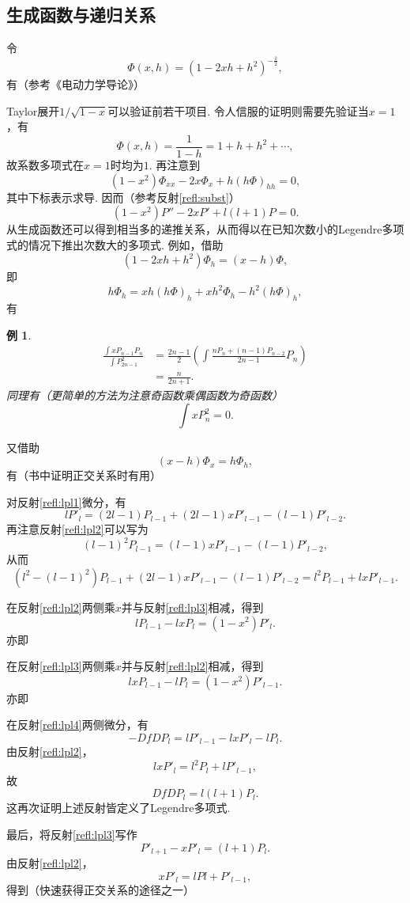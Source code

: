 \documentclass[UTF-8]{ctexart}
\newcommand{\pare}[1]{\left(#1\right)}
\newcommand{\half}{\frac{1}{2}}
\newtheorem{reflection}{反射}
\newcommand{\refl}[1]{\vspace{0.5em}\par\noindent\fbox{%
    \parbox{\textwidth}{%
    \begin{reflection}
        #1
    \end{reflection}
    }%
}\vspace{0.5em}\par}
\newcommand{\rref}[1]{反射\ref{refl:#1}}
\newtheorem{ex}{例}
\begin{document}
  \subsection{生成函数与递归关系}
  令
  \[ \Phi\pare{x,h} = \pare{1-2xh+h^2}^{-\half}, \]
  有（参考《电动力学导论》）
  \refl{
    \[\pare{1-2xh+h^2}^{-\half} = \sum P_l\pare{x}h^l.\]
  }
  Taylor展开$1/\sqrt{1-x}$可以验证前若干项目. 令人信服的证明则需要先验证当$x=1$，有
  \[ \Phi\pare{x,h} = \frac{1}{1-h} = 1+h+h^2+\cdots, \]
  故系数多项式在$x=1$时均为$1$. 再注意到
  \[ \pare{1-x^2}\Phi_{xx}-2x\Phi_x+h\pare{h\Phi}_{hh} = 0, \]
  其中下标表示求导. 因而（参考\rref{subst}）
  \[ \pare{1-x^2}P'' -2xP' + l\pare{l+1}P = 0. \]
  从生成函数还可以得到相当多的递推关系，从而得以在已知次数小的Legendre多项式的情况下推出次数大的多项式. 例如，借助
  \[ \pare{1-2xh+h^2}\Phi_h = \pare{x-h}\Phi, \]
  即
  \[ h\Phi_h = xh\pare{h\Phi}_h + xh^2\Phi_h-h^2\pare{h\Phi}_h, \]
  有
  \refl{
    \label{refl:lpl1}
    \[ lP_l = \pare{2l-1}xP_{l-1} - \pare{l-1}P_{l-2}. \]
  }
  \begin{ex}
    \label{ex:xpp}
    \begin{align*}
      \frac{\int xP_{n-1}P_n}{\int P_{2n-1}^2} &= \frac{2n-1}{2}\pare{\int\frac{nP_n+\pare{n-1}P_{n-2}}{2n-1}P_n} \\
      &= \frac{n}{2n+1}.
    \end{align*}
    同理有（更简单的方法为注意奇函数乘偶函数为奇函数）
    \[ \int xP_n^2 = 0. \]
  \end{ex}
  又借助
  \[ \pare{x-h}\Phi_x = h\Phi_h, \]
  有（书中证明正交关系时有用）
  \refl{
    \label{refl:lpl2}
    \[ lP_l = xP'_l - P'_{l-1}. \]
  }
  对\rref{lpl1}微分，有
  \[ lP'_l = \pare{2l-1}P_{l-1} + \pare{2l-1}xP'_{l-1}-\pare{l-1}P'_{l-2}. \]
  再注意\rref{lpl2}可以写为
  \[ \pare{l-1}^2P_{l-1} = \pare{l-1}xP'_{l-1}-\pare{l-1}P'_{l-2}, \]
  从而
  \[ \pare{l^2-\pare{l-1}^2}P_{l-1} + \pare{2l-1}xP'_{l-1}-\pare{l-1}P'_{l-2} = l^2P_{l-1}+lxP'_{l-1}. \]
  \refl{
    \label{refl:lpl3}
    \[ lP_{l-1} = P'_l - xP'_{l-1}. \]
  }
  在\rref{lpl2}两侧乘$x$并与\rref{lpl3}相减，得到
  \[ lP_{l-1} - lxP_l = \pare{1-x^2}P'_l. \]
  亦即
  \refl{
    \label{refl:lpl4}
    \[ \pare{1-x^2}P'_l = lP_{l-1}-lxP_l. \]
  }
  在\rref{lpl3}两侧乘$x$并与\rref{lpl2}相减，得到
  \[ lxP_{l-1} - lP_l= \pare{1-x^2}P'_{l-1}. \]
  亦即
  \refl{
    \label{refl:lpl5}
    \[ \pare{1-x^2}P'_{l-1} = lxP_{l-1}-lP_l. \]
  }
  在\rref{lpl4}两侧微分，有
  \[ -DfDP_l = lP'_{l-1} - lxP'_l - lP_l. \]
  由\rref{lpl2}，
  \[ lxP'_l = l^2P_l+lP'_{l-1}, \]
  故
  \[ DfDP_l = l\pare{l+1}P_l. \]
  这再次证明上述反射皆定义了Legendre多项式.
  \par
  最后，将\rref{lpl3}写作
  \[ P'_{l+1} - xP'_l = \pare{l+1}P_l. \]
  由\rref{lpl2}，
  \[ xP'_l = lPl + P'_{l-1}, \]
  得到（快速获得正交关系的途径之一）
  \refl{
    \label{refl:lpl6}
    \[ \pare{2l+1}P_l = P'_{l+1}-P'_{l-1}. \]
  }
\end{document}
